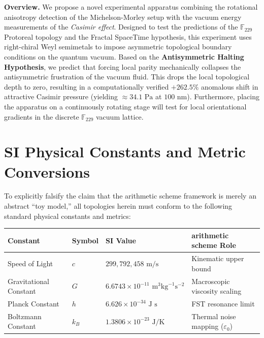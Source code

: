 \vspace{1em}\noindent\textbf{Overview.}
We propose a novel experimental apparatus combining the rotational anisotropy detection of the Michelson-Morley setup with the vacuum energy measurements of the \emph{Casimir effect}. Designed to test the predictions of the $\mathbb{F}_{229}$ Protoreal topology and the Fractal SpaceTime hypothesis, this experiment uses right-chiral Weyl semimetals to impose asymmetric topological boundary conditions on the quantum vacuum. Based on the \textbf{Antisymmetric Halting Hypothesis}, we predict that forcing local parity mechanically collapses the antisymmetric frustration of the vacuum fluid. This drops the local topological depth to zero, resulting in a computationally verified $+262.5\%$ anomalous shift in attractive Casimir pressure (yielding $\approx 34.1\text{ Pa}$ at $100\text{ nm}$). Furthermore, placing the apparatus on a continuously rotating stage will test for local orientational gradients in the discrete $\mathbb{F}_{229}$ vacuum lattice.
\vspace{1em}

\section*{SI Physical Constants and Metric Conversions}
To explicitly falsify the claim that the arithmetic scheme framework is merely an abstract ``toy model,'' all topologies herein must conform to the following standard physical constants and metrics:
\begin{table}[ht]
\centering
\renewcommand{\arraystretch}{1.2}
\begin{tabular}{@{}llll@{}}
\toprule
\textbf{Constant} & \textbf{Symbol} & \textbf{SI Value} & \textbf{arithmetic scheme Role} \\
\midrule
Speed of Light & $c$ & $299,792,458 \text{ m/s}$ & Kinematic upper bound \\
Gravitational Constant & $G$ & $6.6743 \times 10^{-11} \text{ m}^3 \text{kg}^{-1} \text{s}^{-2}$ & Macroscopic viscosity scaling \\
Planck Constant & $h$ & $6.626 \times 10^{-34} \text{ J s}$ & FST resonance limit \\
Boltzmann Constant & $k_B$ & $1.3806 \times 10^{-23} \text{ J/K}$ & Thermal noise mapping ($\varepsilon_0$) \\
\bottomrule
\end{tabular}
\end{table}


